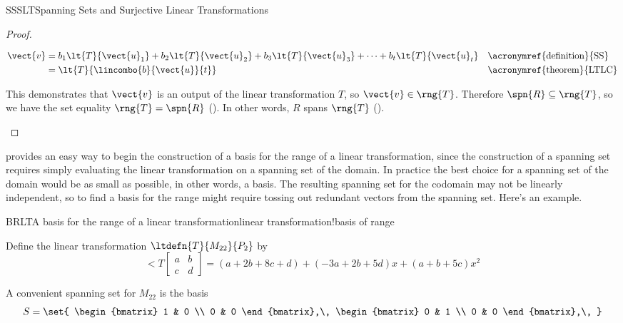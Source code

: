 \begin{subsect}{SSSLT}{Spanning Sets and Surjective Linear Transformations}
\begin{proof}
\begin{para}
%
\begin{align*}
\vect{v}
&=b_1\lt{T}{\vect{u}_1}+b_2\lt{T}{\vect{u}_2}+b_3\lt{T}{\vect{u}_3}+\cdots+b_t\lt{T}{\vect{u}_t}
&&\text{\acronymref{definition}{SS}}\\
&=\lt{T}{\lincombo{b}{\vect{u}}{t}}&&\text{\acronymref{theorem}{LTLC}}
\end{align*}
\end{para}
%
\begin{para}This demonstrates that $\vect{v}$ is an output of the linear transformation $T$, so $\vect{v}\in\rng{T}$.  Therefore $\spn{R}\subseteq\rng{T}$, so we have the set equality $\rng{T}=\spn{R}$ ().  In other words, $R$ spans $\rng{T}$ ().\end{para}
%
\end{proof}
%
\begin{para} provides an easy way to begin the construction of a basis for the range of a linear transformation, since the construction of a spanning set requires simply evaluating the linear transformation on a spanning set of the domain.  In practice the best choice for a spanning set of the domain would be as small as possible, in other words, a basis.  The resulting spanning set for the codomain may not be linearly independent, so to find a basis for the range might require tossing out redundant vectors from the spanning set.  Here's an example.\end{para}
%
\begin{example}{BRLT}{A basis for the range of a linear transformation}{linear transformation!basis of range}
\begin{para}Define the linear transformation $\ltdefn{T}{M_{22}}{P_2}$ by
%
\begin{equation*}
\lt{T}{ \begin{bmatrix} a&b\\c&d \end{bmatrix}}
=\left(a+2b+8c+d\right)+\left(-3a+2b+5d\right)x+\left(a+b+5c\right)x^2
\end{equation*}
\end{para}
%
\begin{para}A convenient spanning set for $M_{22}$ is the basis
%
\begin{equation*}
S=\set{
\begin{bmatrix} 1 & 0 \\ 0 & 0 \end{bmatrix},\,
\begin{bmatrix} 0 & 1 \\ 0 & 0 \end{bmatrix},\,
}
\end{equation*}
\end{para}
\end{example}
\end{subsect}
